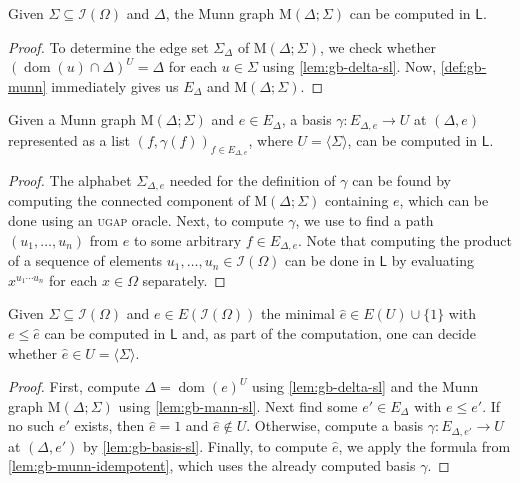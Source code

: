 \documentclass[anonymous,letter,UKenglish,cleveref,autoref,thm-restate]{lipics-v2021}
\renewcommand{\leq}{\leqslant}
\newcommand{\sse}{\subseteq}
\newcommand{\gen}[1]{\langle #1 \rangle}
\newcommand{\dom}{\operatorname{dom}}
\newcommand{\LOGSPACE}{\ensuremath{\mathsf{L}}\xspace}
\newcommand{\ISym}{\cI}
\newcommand{\cI}{\mathcal{I}}
\theoremstyle{plain}
\theoremstyle{plain}
\newcommand{\prob}[1]{\textup{\textsc{#1}}\xspace}
\newcommand{\dUGAP}{\prob{ugap}}
\begin{document}
\begin{lemma}\label{lem:gb-mann-sl}
	Given $\Sigma \sse \ISym(\Omega)$ and $\Delta$, the Munn graph $\mathrm{M}(\Delta; \Sigma)$ can be computed in \LOGSPACE.
\end{lemma}


\begin{proof}
  To determine the edge set $\Sigma_\Delta$ of $\mathrm{M}(\Delta; \Sigma)$, we check whether $(\dom(u)\cap \Delta)^U = \Delta$ for each $u \in \Sigma$ using \cref{lem:gb-delta-sl}.
   Now, \cref{def:gb-munn} immediately gives us $E_\Delta$ and $\mathrm{M}(\Delta; \Sigma)$.
\end{proof}



\begin{lemma}\label{lem:gb-basis-sl}
	Given a Munn graph $\mathrm{M}(\Delta; \Sigma)$ and $e \in E_\Delta$, a basis $\gamma \colon E_{\Delta, e} \to U$ at $(\Delta, e)$ represented as a list $(f,\gamma(f))_{f \in E_{\Delta, e}}$, where $U = \gen\Sigma$, can be computed in \LOGSPACE.
\end{lemma}

\begin{proof}
	The alphabet $\Sigma_{\Delta, e}$ needed for the definition of $\gamma$ can be found by computing the connected component of $\mathrm{M}(\Delta; \Sigma)$ containing $e$, which can be done using an \dUGAP oracle. 
	Next, to compute $\gamma$, we use \cite[Lemma 2.4]{NisanT95} to find a path $(u_1, \dots, u_n)$ from $e$ to some arbitrary $f\in E_{\Delta,e}$.
	Note that computing the product of a sequence of elements $u_1, \dots, u_n \in \ISym(\Omega)$ can be done in \LOGSPACE by evaluating $x^{u_1 \cdots u_n}$ for each $x \in \Omega$ separately.
\end{proof}




\begin{lemma}\label{lem:gb-hat-e-sl}
  Given $\Sigma \sse \ISym(\Omega)$ and $e \in E(\ISym(\Omega))$ the minimal $\hat e \in E(U) \cup \{1\}$ with $e \leq \hat e$ can be computed in \LOGSPACE{} and, as part of the computation, one can decide whether $\hat e \in U = \gen\Sigma$.
\end{lemma}

\begin{proof}
	First, compute $\Delta = \dom(e)^U$ using \cref{lem:gb-delta-sl} and the Munn graph $\mathrm{M}(\Delta; \Sigma)$ using \cref{lem:gb-mann-sl}.
	Next find some  $e' \in E_\Delta$ with $e \leq e'$. If no such $e'$ exists, then $\hat e = 1$ and $\hat e \not\in U$.
	Otherwise, compute a basis  $\gamma \colon E_{\Delta, e'} \to U$  at $(\Delta, e')$ by \cref{lem:gb-basis-sl}.	
	Finally, to compute $\hat e$, we apply the formula from \cref{lem:gb-munn-idempotent}, which uses the already computed basis $\gamma$.	
\end{proof}
\end{document}
